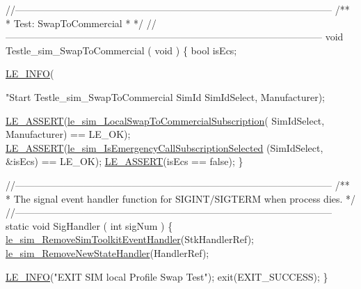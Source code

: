 \begin{DoxyCodeInclude}
{{{{{{{{{{{{\textcolor{comment}{//--------------------------------------------------------------------------------------------------}\textcolor{comment}{}
\textcolor{comment}{/**}
\textcolor{comment}{ * Test: SwapToCommercial}
\textcolor{comment}{ *}
\textcolor{comment}{ */}
\textcolor{comment}{//--------------------------------------------------------------------------------------------------}
\textcolor{keywordtype}{void} Testle\_sim\_SwapToCommercial
(
    \textcolor{keywordtype}{void}
)
\{
    \textcolor{keywordtype}{bool} isEcs;

    \hyperlink{le__log_8h_a23e6d206faa64f612045d688cdde5808}{LE\_INFO}(\textcolor{stringliteral}{"Start Testle\_sim\_SwapToCommercial SimId %
        SimIdSelect, Manufacturer);

    \hyperlink{le__log_8h_ac0dbbef91dc0fed449d0092ff0557b39}{LE\_ASSERT}(\hyperlink{le__sim__interface_8h_a51b535750b66c4cf460e3c8c72f3658d}{le\_sim\_LocalSwapToCommercialSubscription}(
      SimIdSelect, Manufacturer) == LE\_OK);
    \hyperlink{le__log_8h_ac0dbbef91dc0fed449d0092ff0557b39}{LE\_ASSERT}(\hyperlink{le__sim__interface_8h_a837cdc0fe30761f4339f846a0b44c5f1}{le\_sim\_IsEmergencyCallSubscriptionSelected}
      (SimIdSelect, &isEcs) == LE\_OK);
    \hyperlink{le__log_8h_ac0dbbef91dc0fed449d0092ff0557b39}{LE\_ASSERT}(isEcs == \textcolor{keyword}{false});
\}

\textcolor{comment}{//--------------------------------------------------------------------------------------------------}\textcolor{comment}{}
\textcolor{comment}{/**}
\textcolor{comment}{ * The signal event handler function for SIGINT/SIGTERM when process dies.}
\textcolor{comment}{ */}
\textcolor{comment}{//--------------------------------------------------------------------------------------------------}
\textcolor{keyword}{static} \textcolor{keywordtype}{void} SigHandler
(
    \textcolor{keywordtype}{int} sigNum
)
\{
    \hyperlink{le__sim__interface_8h_a2485840533f80632a61096b1d7c5d8f2}{le\_sim\_RemoveSimToolkitEventHandler}(StkHandlerRef);
    \hyperlink{le__sim__interface_8h_a0286578e9aa46ba864df1878263b9f84}{le\_sim\_RemoveNewStateHandler}(HandlerRef);

    \hyperlink{le__log_8h_a23e6d206faa64f612045d688cdde5808}{LE\_INFO}(\textcolor{stringliteral}{"EXIT SIM local Profile Swap Test"});
    exit(EXIT\_SUCCESS);
\}

}}}}}}}}}}}}}
\end{DoxyCodeInclude}
